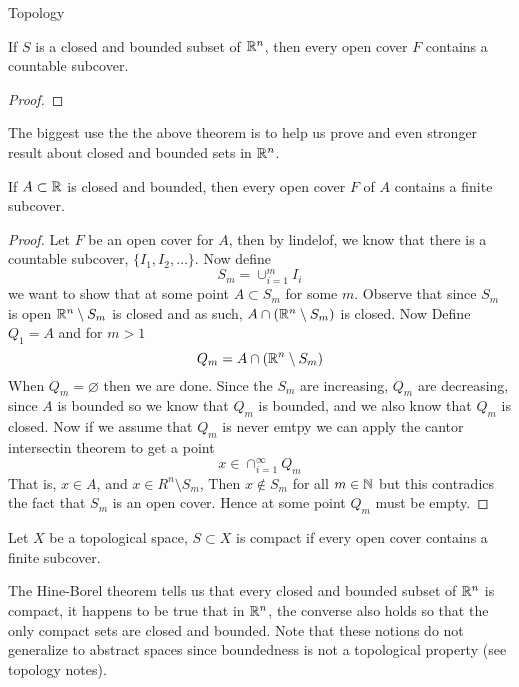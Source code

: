 \begin{chapter}{Topology}
    \begin{thm}
        If $S$ is a closed and bounded subset of $\mathbb{R}^n$, then every open cover $F$ contains a countable subcover. 
    \end{thm}  

    \begin{proof}
        
    \end{proof}

    The biggest use the the above theorem is to help us prove and even stronger result about closed and bounded sets in $\mathbb{R}^n$.

    \begin{thm}
        If $A \subset \mathbb{R}$ is closed and bounded, then every open cover $F$ of $A$ contains 
        a finite subcover. 
    \end{thm}

    \begin{proof}
        Let $F$ be an open cover for $A$, then by lindelof, we know that there is a countable subcover, 
        $\{I_1, I_2, \dots \}$. Now define 
        \[S_m  = \cup_{i = 1}^m I_i\]
        we want to show that at some point $A \subset S_m$ for some $m$. Observe that since $S_m$ is open 
        $\mathbb{R}^n \setminus S_m$ is closed and as such, $A \cap (\mathbb{R}^n \setminus S_m)$ is closed. Now Define $Q_1 = A$ and for $m > 1$ 
        \[Q_m = A \cap (\mathbb{R}^n \setminus S_m)\]
        When $Q_m = \varnothing $ then we are done. Since the $S_m$ are increasing, $Q_m$ are decreasing, since $A$ is bounded so we know that $Q_m$ is bounded, and 
        we also know that $Q_m$ is closed. Now if we assume that $Q_m$ is never emtpy we can apply the cantor intersectin theorem to get a point 
        \[x \in \cap_{i = 1}^\infty Q_m\]
        That is, $x \in A$, and $x \in R^n \setminus S_m$, Then $x \notin S_m$ for all $m \in \mathbb{N}$ but this contradics the fact that $S_m$ is an open cover. 
        Hence at some point $Q_m$ must be empty. 
    \end{proof}

    \begin{defn}
        Let $X$ be a topological space, $S \subset X$ is compact if every open cover contains a finite subcover.
    \end{defn}

    The Hine-Borel theorem tells us that every closed and bounded subset of $\mathbb{R}^n$ is compact, it happens to be true that 
    in $\mathbb{R}^n$, the converse also holds so that the only compact sets are closed and bounded. Note that these notions do not 
    generalize to abstract spaces since boundedness is not a topological property (see topology notes). 



\end{chapter}

